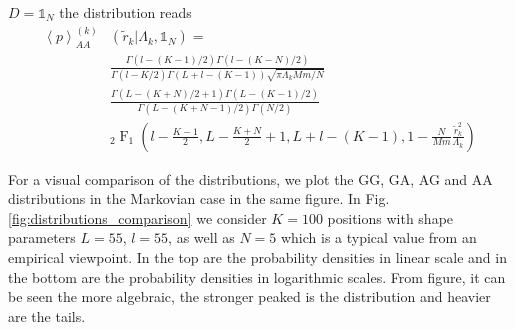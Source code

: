 $D = \mathbb{1}_{N}$ the distribution reads
\begin{equation}
    \begin{split}
    \left\langle p \right\rangle_{AA}^{\left(k\right)} &
    \left(\tilde{r}_{k} \vert \Lambda_{k}, \mathbb{1}_{N}\right) = \\
    &\frac{\Gamma\left(l - \left(K - 1 \right) / 2\right)
    \Gamma\left(l - \left(K - N\right) / 2\right)}
    {\Gamma\left(l - K/ 2\right) \Gamma\left(L + l - \left(K - 1\right) \right)
    \sqrt{\pi \Lambda_{k}Mm/N}} \\
    &\frac{\Gamma\left(L - \left(K + N \right) / 2 + 1\right)
    \Gamma\left(L - \left(K - 1\right) / 2\right)}
    {\Gamma\left(L - \left(K + N - 1\right) / 2\right) \Gamma\left(N / 2\right)
    } \\
    & _{2}\operatorname{F}_{1} \left(l - \frac{K - 1}{2}, L -\frac{K + N}{2}+1,
    L + l - \left(K - 1\right), 1 - \frac{N}{Mm} \frac{\tilde{r}^{2}_{k}}
    {\Lambda_{k}}\right)
    \end{split}
\end{equation}

For a visual comparison of the distributions, we plot the GG, GA, AG and AA
distributions in the Markovian case in the same figure. In Fig. \ref{fig:distributions_comparison}
we consider $K = 100$ positions with shape parameters $L = 55$, $l = 55$, as
well as $N = 5$ which is a typical value from an empirical viewpoint. In the top
are the probability densities in linear scale and in the bottom are the probability
densities in logarithmic scales. From figure, it can be seen the more algebraic,
the stronger peaked is the distribution and heavier are the tails.

